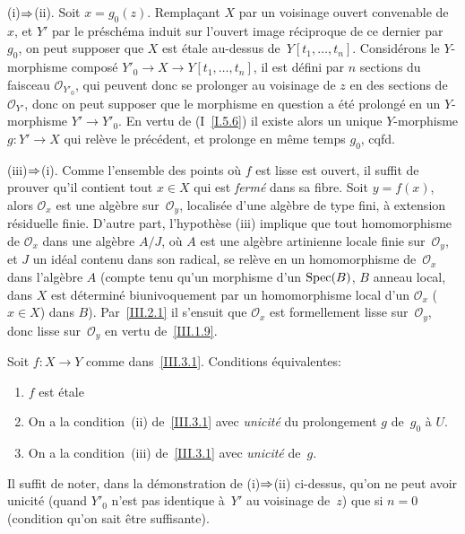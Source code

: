 (i)$\To$(ii). Soit $x = g_0(z)$. Rempla\c cant $X$ par un
voisinage ouvert convenable de~$x$, et $Y'$ par le pr\'esch\'ema
induit sur l'ouvert image r\'eciproque de ce dernier par~$g_0$, on
peut supposer que $X$ est \'etale au-dessus de~$Y[t_1, \dots, t_n]$.
Consid\'erons le $Y$-morphisme compos\'e $Y'_0 \to X \to Y[t_1,
\dots, t_n]$, il est d\'efini par $n$ sections du faisceau
$\mathcal{O}_{Y'_0}$, qui peuvent donc se prolonger au voisinage de
$z$ en des sections de~$\mathcal{O}_{Y'}$, donc on peut supposer que
le morphisme en question a \'et\'e prolong\'e en un
$Y$-morphisme $Y' \to Y'_0$. En vertu de (I~\ref{I.5.6}) il existe
alors un unique $Y$-morphisme $g \colon Y' \to X$ qui rel\`eve le
pr\'ec\'edent, et prolonge en m\^eme temps $g_0$, cqfd.

(iii)$\To$(i). Comme l'ensemble des points o\`u $f$ est
lisse est ouvert, il suffit de prouver qu'il contient tout $x \in X$
qui est \emph{fermé} dans sa fibre. Soit $y = f(x)$, alors
$\mathcal{O}_x$ est une alg\`ebre sur~$\mathcal{O}_y$, localis\'ee
d'une alg\`ebre de type fini, \`a extension r\'esiduelle finie.
D'autre part, l'hypoth\`ese (iii) implique que tout homomorphisme de
$\mathcal{O}_x$ dans une alg\`ebre $A/J$, o\`u $A$ est une
alg\`ebre artinienne locale finie sur~$\mathcal{O}_y$, et $J$ un
id\'eal contenu dans son radical, se rel\`eve en un homomorphisme
de~$\mathcal{O}_x$ dans l'alg\`ebre $A$ (compte tenu qu'un morphisme
d'un $\operatorname{Spec}(B)$, $B$ anneau local, dans $X$ est d\'etermin\'e
biunivoquement par un homomorphisme local d'un $\mathcal{O}_x$ ($x \in
X$) dans $B$). Par~\ref{III.2.1} il s'ensuit que $\mathcal{O}_x$ est
formellement lisse sur~$\mathcal{O}_y$, donc lisse sur~$\mathcal{O}_y$
en vertu de~\ref{III.1.9}.

\begin{corollaire}
\label{III.3.2}
Soit $f\colon X\to Y$ comme dans~\ref{III.3.1}. Conditions
\'equivalentes:
\begin{enumerate}
\item[(i)] $f$ est \'etale
\item[(ii)] On a la condition~\textup{(ii)} de~\ref{III.3.1} avec
{\emph{unicité}} du prolongement $g$ de~$g_0$ \`a $U$.
\item[(iii)] On a la condition~\textup{(iii)} de~\ref{III.3.1} avec
{\emph{unicité}} de~$g$.
\end{enumerate}
\end{corollaire}

Il suffit de noter, dans la d\'emonstration de (i)$\To$(ii)
ci-dessus, qu'on ne peut avoir unicit\'e (quand $Y'_0$ n'est pas
identique \`a~$Y'$ au voisinage de~$z$) que si $n=0$ (condition
qu'on sait \^etre suffisante).

